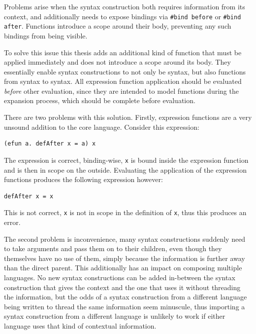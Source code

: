 \documentclass{kththesis}
\begin{document}
Problems arise when the syntax construction both requires information from its context, and additionally needs to expose bindings via \texttt{#bind before} or \texttt{#bind after}. Functions introduce a scope around their body, preventing any such bindings from being visible.

To solve this issue this thesis adds an additional kind of function that must be applied immediately and does not introduce a scope around its body. They essentially enable syntax constructions to not only be syntax, but also functions from syntax to syntax. All expression function application should be evaluated \emph{before} other evaluation, since they are intended to model functions during the expansion process, which should be complete before evaluation.

There are two problems with this solution. Firstly, expression functions are a very unsound addition to the core language. Consider this expression:

\begin{verbatim}
(efun a. defAfter x = a) x
\end{verbatim}

The expression is correct, binding-wise, \texttt{x} is bound inside the expression function and is then in scope on the outside. Evaluating the application of the expression functions produces the following expression however:

\begin{verbatim}
defAfter x = x
\end{verbatim}

This is not correct, \texttt{x} is not in scope in the definition of \texttt{x}, thus this produces an error.

The second problem is inconvenience, many syntax constructions suddenly need to take arguments and pass them on to their children, even though they themselves have no use of them, simply because the information is further away than the direct parent. This additionally has an impact on composing multiple languages. No new syntax constructions can be added in-between the syntax construction that gives the context and the one that uses it without threading the information, but the odds of a syntax construction from a different language being written to thread the same information seem minuscule, thus importing a syntax construction from a different language is unlikely to work if either language uses that kind of contextual information.
\end{document}
